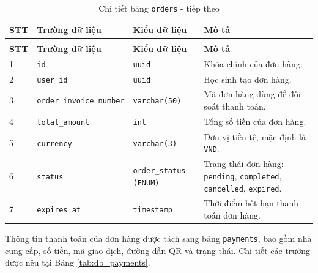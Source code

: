 \documentclass[../DoAn.tex]{subfiles}
\begin{document}
{\begin{longtable}{|p{}|p{}|p{}|p{}|}
\caption{Chi tiết bảng \texttt{orders}}
\label{tab:db_orders}\\
\hline
\textbf{STT} & \textbf{Trường dữ liệu} & \textbf{Kiểu dữ liệu} & \textbf{Mô tả} \\ \hline
\endfirsthead
\caption[]{Chi tiết bảng \texttt{orders} - tiếp theo}\\
\hline
\textbf{STT} & \textbf{Trường dữ liệu} & \textbf{Kiểu dữ liệu} & \textbf{Mô tả} \\ \hline
\endhead
1 & \texttt{id} & \texttt{uuid} & Khóa chính của đơn hàng. \\ \hline
2 & \texttt{user\_id} & \texttt{uuid} & Học sinh tạo đơn hàng. \\ \hline
3 & \texttt{order\_invoice\_number} & \texttt{varchar(50)} & Mã đơn hàng dùng để đối soát thanh toán. \\ \hline
4 & \texttt{total\_amount} & \texttt{int} & Tổng số tiền của đơn hàng. \\ \hline
5 & \texttt{currency} & \texttt{varchar(3)} & Đơn vị tiền tệ, mặc định là \texttt{VND}. \\ \hline
6 & \texttt{status} & \texttt{order\_status (ENUM)} & Trạng thái đơn hàng: \texttt{pending}, \texttt{completed}, \texttt{cancelled}, \texttt{expired}. \\ \hline
7 & \texttt{expires\_at} & \texttt{timestamp} & Thời điểm hết hạn thanh toán đơn hàng. \\ \hline
\end{longtable}

Thông tin thanh toán của đơn hàng được tách sang bảng \texttt{payments}, bao gồm nhà cung cấp, số tiền, mã giao dịch, đường dẫn QR và trạng thái. Chi tiết các trường được nêu tại Bảng \ref{tab:db_payments}.

}
\end{document}
